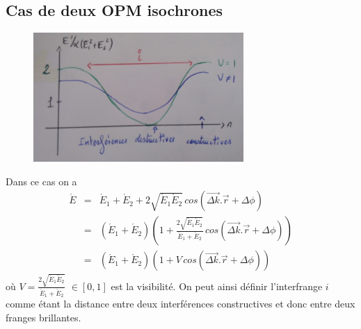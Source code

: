 \documentclass[12pt,prb,aps,epsf]{report}
\begin{document}
\subsection{Cas de deux OPM isochrones}

\begin{figure}[h]
	\centerline{ \includegraphics[width=8cm]{2OPPM}}
\end{figure}
Dans ce cas on a 
\begin{eqnarray}
\acute{E} &=& \acute{E}_1 +\acute{E}_2 + 2 \sqrt{\acute{E}_1\acute{E}_2}\,cos(\vec{\Delta k}.\vec{r}+\Delta\phi) \\
&=& (\acute{E}_1 +\acute{E}_2)\left(1+\frac{2 \sqrt{\acute{E}_1\acute{E}_2}}{\acute{E}_1 + \acute{E}_2}\,cos(\vec{\Delta k}.\vec{r}+\Delta\phi)\right)\\
&=& (\acute{E}_1 + \acute{E}_2)\left(1+V\,cos(\vec{\Delta k}.\vec{r}+\Delta\phi)\right)
\end{eqnarray}
où $V=\frac{2 \sqrt{\acute{E}_1\acute{E}_2}}{\acute{E}_1 + \acute{E}_2}$ $\in [0,1]$ est la visibilité. On peut ainsi définir l'interfrange $i$ comme étant la distance entre deux interférences constructives et donc entre deux franges brillantes.\\
\end{document}
